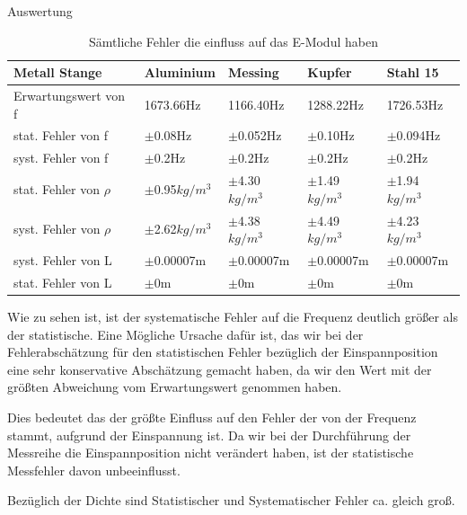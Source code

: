 \documentclass[twoside]{protokoll}
\begin{document}
\begin{aufgabe}{Auswertung}
 \begin{table}[H]
        \centering
        \begin{tabularx}{1\textwidth}{l X X X X} %
            \toprule
            \textbf{Metall Stange} & \textbf{Aluminium} & \textbf{Messing} & \textbf{Kupfer} & \textbf{Stahl 15} \\
            \midrule
            Erwartungswert von f & 1673.66Hz & 1166.40Hz & 1288.22Hz & 1726.53Hz \\
            stat. Fehler von f & $\pm$0.08Hz & $\pm$0.052Hz & $\pm$0.10Hz & $\pm$0.094Hz \\
            syst. Fehler von f & $\pm$0.2Hz & $\pm$0.2Hz & $\pm$0.2Hz & $\pm$0.2Hz \\
            \midrule
            stat. Fehler von $\rho$ & $\pm$0.95$kg/m^3$ & $\pm$4.30$kg/m^3$ & $\pm$1.49$kg/m^3$ & $\pm$1.94$kg/m^3$ \\
            syst. Fehler von $\rho$ & $\pm$2.62$kg/m^3$ & $\pm$4.38$kg/m^3$ & $\pm$4.49$kg/m^3$ & $\pm$4.23$kg/m^3$ \\
            \midrule
            syst. Fehler von L      & $\pm$0.00007m     & $\pm$0.00007m     & $\pm$0.00007m     & $\pm$0.00007m \\
            stat. Fehler von L      & $\pm$0m     & $\pm$0m     & $\pm$0m     & $\pm$0m \\
            \bottomrule
        \end{tabularx}
        \caption{Sämtliche Fehler die einfluss auf das E-Modul haben}
    \end{table}
    
Wie zu sehen ist, ist der systematische Fehler auf die Frequenz deutlich größer als der statistische.
Eine Mögliche Ursache dafür ist, das wir bei der Fehlerabschätzung für den statistischen Fehler bezüglich der Einspannposition eine sehr konservative Abschätzung gemacht haben,
da wir den Wert mit der größten Abweichung vom Erwartungswert genommen haben.

Dies bedeutet das der größte Einfluss auf den Fehler der von der Frequenz stammt, aufgrund der Einspannung ist.
Da wir bei der Durchführung der Messreihe die Einspannposition nicht verändert haben, ist der statistische Messfehler davon unbeeinflusst.

Bezüglich der Dichte sind Statistischer und Systematischer Fehler ca. gleich groß. \\
 

\end{aufgabe}
\end{document}
